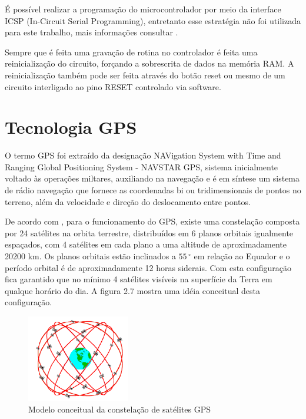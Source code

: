 É possível realizar a programação do microcontrolador por meio da interface ICSP (In-Circuit Serial Programming), entretanto esse estratégia não foi utilizada para este trabalho, mais informações consultar \textcite{arduino_icsp:2013}.

Sempre que é feita uma gravação de rotina no controlador é feita uma reinicialização do circuito, forçando a sobrescrita de dados na memória RAM. A reinicialização também pode ser feita através do botão reset ou mesmo de um circuito interligado ao pino RESET controlado via software.

\section{Tecnologia GPS}

O termo GPS foi extraído da designação NAVigation System with Time and Ranging Global Positioning System - NAVSTAR GPS, sistema inicialmente voltado às operações miltares, auxiliando na navegação e é em síntese um sistema de rádio navegação que fornece as coordenadas bi ou tridimensionais de pontos no terreno, além da velocidade e direção do deslocamento entre pontos.

De acordo com \textcite{gps_iniciantes:2003}, para o funcionamento do GPS, existe uma constelação composta por 24 satélites na orbita terrestre, distribuídos em 6 planos orbitais igualmente espaçados, com 4 satélites em cada plano a uma altitude de aproximadamente 20200 km. Os planos orbitais estão inclinados a $55\,^{\circ}$ em relação ao Equador e o período orbital é de aproximadamente 12 horas siderais. Com esta configuração fica garantido que no mínimo 4 satélites visíveis na superfície da Terra em qualque horário do dia. A figura 2.7 mostra uma idéia conceitual desta configuração.

\begin{figure}[h!]
			\centering
			\includegraphics[width=0.4\textwidth]{figures/constelacaoGPS.png}
			\caption{Modelo conceitual da constela\c{c}\~{a}o de sat\'{e}lites GPS}
			\label{1}
\end{figure}

